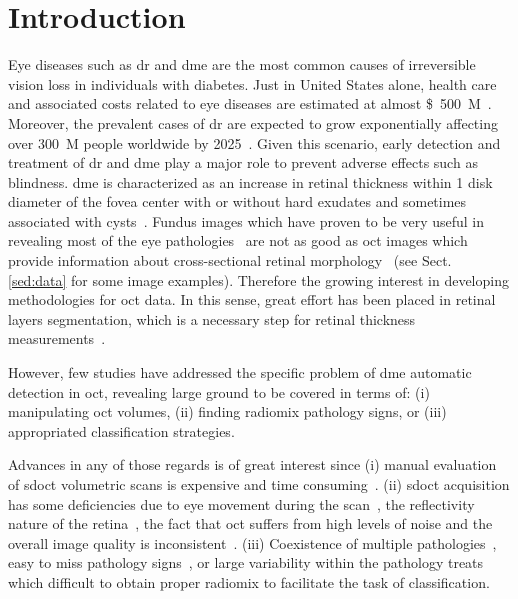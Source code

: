 \graphicspath{ {./content/intro/figures/} }

\section{Introduction}
\label{sec:intro}  %

    Eye diseases such as \gls{dr} and \gls{dme} are the most common causes of irreversible vision loss in individuals with diabetes.
 Just in United States alone, health care and associated costs related to eye diseases are estimated at almost \SI{500}[\$]{M}~\cite{Sharma2005}.
 Moreover, the prevalent cases of \gls{dr} are expected to grow exponentially affecting over \SI{300}{M} people worldwide by 2025~\cite{Wild2004}.
 Given this scenario, early detection and treatment of \gls{dr} and \gls{dme} play a major role to prevent adverse effects such as blindness.
 \gls{dme} is characterized as an increase in retinal thickness within 1 disk diameter of the fovea center with or without hard exudates and sometimes associated with cysts~\cite{ETDRSG1985}.
 Fundus images which have proven to be very useful in revealing most of the eye pathologies~\cite{Mookiah20132136,Trucco2013} are not as good as \gls{oct} images which provide information about cross-sectional retinal morphology~\cite{Wang2015} (see Sect.\,\ref{sed:data} for some image examples).
 Therefore the growing interest in developing methodologies for \gls{oct} data.
 In this sense, great effort has been placed in retinal layers segmentation,
 which is a necessary step for retinal thickness measurements~\cite{Chiu2010,Kafieh2013}.

 However, few studies have addressed the specific problem of \gls{dme} automatic detection in \gls{oct}, revealing large ground to be covered in terms of: (i) manipulating \gls{oct} volumes, (ii) finding radiomix pathology signs, or (iii) appropriated classification strategies.

 Advances in any of those regards is of great interest since (i) manual evaluation of \gls{sdoct} volumetric scans is expensive and time consuming~\cite{Venhuizen2015}.
 (ii) \gls{sdoct} acquisition has some deficiencies due to eye movement during the scan~\cite{Liu2011}, the reflectivity nature of the retina~\cite{sehuman2014}, the fact that \gls{oct} suffers from high levels of noise and the overall image quality is inconsistent~\cite{barnum}.
 (iii) Coexistence of multiple pathologies~\cite{Liu2011}, easy to miss pathology signs~\cite{Venhuizen2015}, or large variability within the pathology treats which difficult to obtain proper radiomix to facilitate the task of classification.


